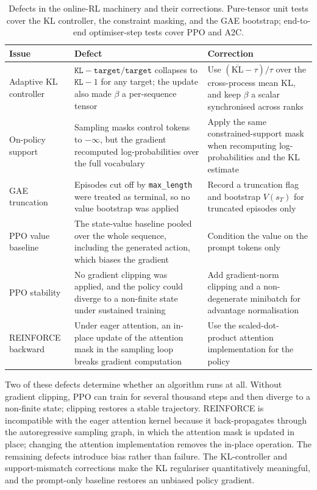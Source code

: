 \documentclass[11pt]{article}
\begin{document}
\begin{table}[h]
\centering
\small
\begin{tabular}{@{}p{3.3cm}p{6.3cm}p{4.3cm}@{}}
\toprule
\textbf{Issue} & \textbf{Defect} & \textbf{Correction} \\
\midrule
Adaptive KL controller &
$\texttt{KL} - \texttt{target}/\texttt{target}$ collapses to $\texttt{KL}-1$ for
any target; the update also made $\beta$ a per-sequence tensor &
Use $(\overline{\mathrm{KL}}-\tau)/\tau$ over the cross-process mean KL, and keep
$\beta$ a scalar synchronised across ranks \\
\addlinespace
On-policy support &
Sampling masks control tokens to $-\infty$, but the gradient recomputed
log-probabilities over the full vocabulary &
Apply the same constrained-support mask when recomputing log-probabilities and
the KL estimate \\
\addlinespace
GAE truncation &
Episodes cut off by \texttt{max\_length} were treated as terminal, so no value
bootstrap was applied &
Record a truncation flag and bootstrap $V(s_T)$ for truncated episodes only \\
\addlinespace
PPO value baseline &
The state-value baseline pooled over the whole sequence, including the generated
action, which biases the gradient &
Condition the value on the prompt tokens only \\
\addlinespace
PPO stability &
No gradient clipping was applied, and the policy could diverge to a non-finite
state under sustained training &
Add gradient-norm clipping and a non-degenerate minibatch for advantage
normalisation \\
\addlinespace
REINFORCE backward &
Under eager attention, an in-place update of the attention mask in the sampling
loop breaks gradient computation &
Use the scaled-dot-product attention implementation for the policy \\
\bottomrule
\end{tabular}
\caption{Defects in the online-RL machinery and their corrections. Pure-tensor
unit tests cover the KL controller, the constraint masking, and the GAE bootstrap;
end-to-end optimiser-step tests cover PPO and A2C.}
\label{tab:fixes}
\end{table}

Two of these defects determine whether an algorithm runs at all. Without gradient
clipping, PPO can train for several thousand steps and then diverge to a
non-finite state; clipping restores a stable trajectory. REINFORCE is incompatible
with the eager attention kernel because it back-propagates through the
autoregressive sampling graph, in which the attention mask is updated in place;
changing the attention implementation removes the in-place operation. The remaining
defects introduce bias rather than failure. The KL-controller and support-mismatch
corrections make the KL regulariser quantitatively meaningful, and the prompt-only
baseline restores an unbiased policy gradient.
\end{document}
